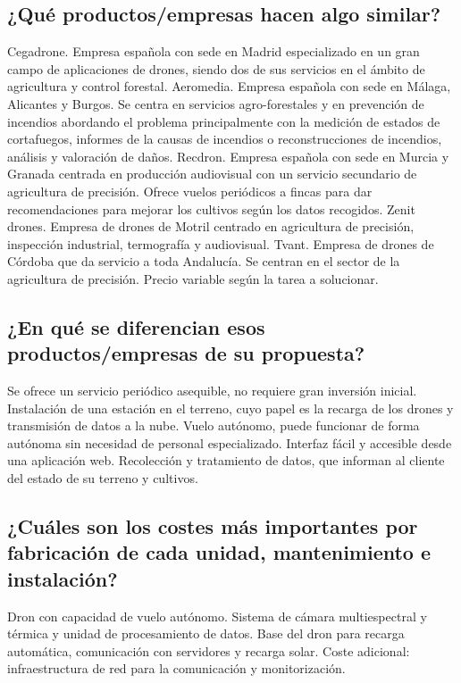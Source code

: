 \documentclass[11pt,spanish]{article} %
\begin{document}
\subsection{¿Qué productos/empresas hacen algo similar?}
Cegadrone. Empresa española con sede en Madrid especializado en un gran campo de aplicaciones de drones, siendo dos de sus servicios en el ámbito de agricultura y control forestal. 
Aeromedia. Empresa española con sede en Málaga, Alicantes y Burgos. Se centra en servicios agro-forestales y en prevención de incendios abordando el problema principalmente con la medición de estados de cortafuegos, informes de la causas de incendios o reconstrucciones de incendios, análisis y valoración de daños.
Recdron. Empresa española con sede en Murcia y Granada centrada en producción audiovisual con un servicio secundario de agricultura de precisión. Ofrece vuelos periódicos a fincas para dar recomendaciones para mejorar los cultivos según los datos recogidos.  
Zenit drones. Empresa de drones de Motril centrado en agricultura de precisión, inspección industrial, termografía y audiovisual.
Tvant. Empresa de drones de Córdoba que da servicio a toda Andalucía. Se centran en el sector de la agricultura de precisión. Precio variable según la tarea a solucionar.

\subsection{¿En qué se diferencian esos productos/empresas de su propuesta?}
Se ofrece un servicio periódico asequible, no requiere gran inversión inicial. 
Instalación de una estación en el terreno, cuyo papel es la recarga de los drones y transmisión de datos a la nube.
Vuelo autónomo, puede funcionar de forma autónoma sin necesidad de personal especializado.
Interfaz fácil y accesible desde una aplicación web.
Recolección y tratamiento de datos, que informan al cliente del estado de su terreno y cultivos.

\subsection{¿Cuáles son los costes más importantes por fabricación de cada unidad, mantenimiento e instalación?}

Dron con capacidad de vuelo autónomo.
Sistema de cámara multiespectral y térmica y unidad de procesamiento de datos.
Base del dron para recarga automática, comunicación con servidores y recarga solar.
Coste adicional: infraestructura de red para la comunicación y monitorización.
\end{document}
